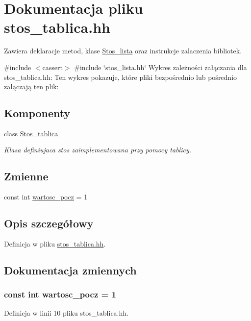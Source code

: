 \hypertarget{stos__tablica_8hh}{\section{\-Dokumentacja pliku stos\-\_\-tablica.\-hh}
\label{stos__tablica_8hh}
}


\-Zawiera deklaracje metod, klase \hyperlink{class_stos__lista}{\-Stos\-\_\-lista} oraz instrukcje zalaczenia bibliotek.  


{\ttfamily \#include $<$cassert$>$}\*
{\ttfamily \#include \char`\"{}stos\-\_\-lista.\-hh\char`\"{}}\*
\-Wykres zależności załączania dla stos\-\_\-tablica.\-hh\-:
\-Ten wykres pokazuje, które pliki bezpośrednio lub pośrednio załączają ten plik\-:
\subsection*{\-Komponenty}
\begin{DoxyCompactItemize}
\item 
class \hyperlink{class_stos__tablica}{\-Stos\-\_\-tablica}
\begin{DoxyCompactList}\small\item\em \-Klasa definiujaca stos zaimplementowana przy pomocy tablicy. \end{DoxyCompactList}\end{DoxyCompactItemize}
\subsection*{\-Zmienne}
\begin{DoxyCompactItemize}
\item 
const int \hyperlink{stos__tablica_8hh_ad58324e092402421e4e3b9c3d4efdd7f}{wartosc\-\_\-pocz} = 1
\end{DoxyCompactItemize}


\subsection{\-Opis szczegółowy}


\-Definicja w pliku \hyperlink{stos__tablica_8hh_source}{stos\-\_\-tablica.\-hh}.



\subsection{\-Dokumentacja zmiennych}
\hypertarget{stos__tablica_8hh_ad58324e092402421e4e3b9c3d4efdd7f}{
\subsubsection[{wartosc\-\_\-pocz}]{\setlength{\rightskip}{0pt plus 5cm}const int {\bf wartosc\-\_\-pocz} = 1}}\label{stos__tablica_8hh_ad58324e092402421e4e3b9c3d4efdd7f}


\-Definicja w linii 10 pliku stos\-\_\-tablica.\-hh.

